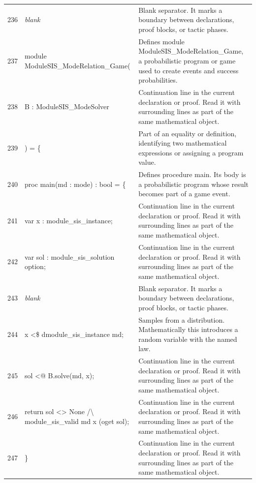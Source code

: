\documentclass[10pt]{article}
\begin{document}
\begin{longtable}{r L{0.53\textwidth} L{0.37\textwidth}}
236 & {\ttfamily\scriptsize \emph{blank}} & Blank separator.  It marks a boundary between declarations, proof blocks, or tactic phases. \\
237 & {\ttfamily\scriptsize module ModuleSIS\_ModeRelation\_Game(} & Defines module ModuleSIS\_ModeRelation\_Game, a probabilistic program or game used to create events and success probabilities. \\
238 & {\ttfamily\scriptsize   B : ModuleSIS\_ModeSolver} & Continuation line in the current declaration or proof.  Read it with surrounding lines as part of the same mathematical object. \\
239 & {\ttfamily\scriptsize ) = \{} & Part of an equality or definition, identifying two mathematical expressions or assigning a program value. \\
240 & {\ttfamily\scriptsize   proc main(md : mode) : bool = \{} & Defines procedure main.  Its body is a probabilistic program whose result becomes part of a game event. \\
241 & {\ttfamily\scriptsize     var x : module\_sis\_instance;} & Continuation line in the current declaration or proof.  Read it with surrounding lines as part of the same mathematical object. \\
242 & {\ttfamily\scriptsize     var sol : module\_sis\_solution option;} & Continuation line in the current declaration or proof.  Read it with surrounding lines as part of the same mathematical object. \\
243 & {\ttfamily\scriptsize \emph{blank}} & Blank separator.  It marks a boundary between declarations, proof blocks, or tactic phases. \\
244 & {\ttfamily\scriptsize     x <\$ dmodule\_sis\_instance md;} & Samples from a distribution.  Mathematically this introduces a random variable with the named law. \\
245 & {\ttfamily\scriptsize     sol <@ B.solve(md, x);} & Continuation line in the current declaration or proof.  Read it with surrounding lines as part of the same mathematical object. \\
246 & {\ttfamily\scriptsize     return sol <> None /\textbackslash{} module\_sis\_valid md x (oget sol);} & Continuation line in the current declaration or proof.  Read it with surrounding lines as part of the same mathematical object. \\
247 & {\ttfamily\scriptsize   \}} & Continuation line in the current declaration or proof.  Read it with surrounding lines as part of the same mathematical object. \\

\end{longtable}
\end{document}
